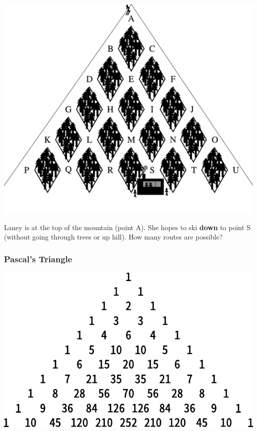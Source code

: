 
\begin{frame}
\begin{center}
\includegraphics[scale=0.3]{3-4_binomial_distribution/figures/ski/ski.pdf}
\end{center}
Laney is at the top of the mountain (point A). She hopes to ski {\bf down} to point S (without going through trees or up hill). How many routes are possible?
\pause
{}
\end{frame} 

\begin{frame}
\frametitle{Pascal's Triangle}
\begin{center}
\includegraphics[scale=1]{3-4_binomial_distribution/figures/pascal/pascal.pdf}
\end{center}
\end{frame} 


